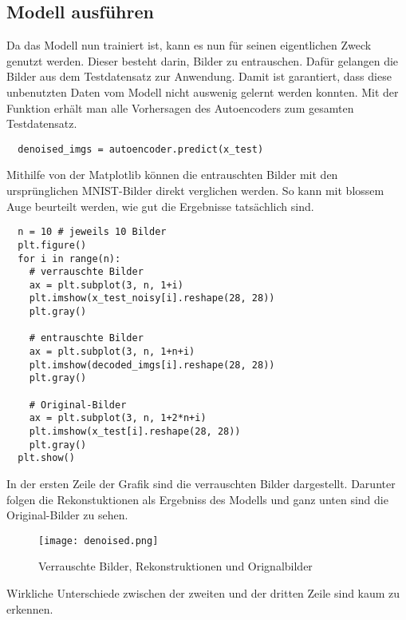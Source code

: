 \subsection{Modell ausführen}
Da das Modell nun trainiert ist, kann es nun für seinen eigentlichen Zweck
genutzt werden.
Dieser besteht darin, Bilder zu entrauschen. Dafür gelangen die
Bilder aus dem Testdatensatz zur Anwendung. Damit ist garantiert, dass diese
unbenutzten Daten vom Modell nicht auswenig gelernt werden konnten.
Mit der Funktion 
erhält man alle Vorhersagen des Autoencoders zum gesamten Testdatensatz.
\begin{verbatim}
  denoised_imgs = autoencoder.predict(x_test)
\end{verbatim}
Mithilfe von der Matplotlib können die entrauschten Bilder mit den
ursprünglichen MNIST-Bilder direkt verglichen werden.
So kann mit blossem Auge beurteilt werden, wie gut die Ergebnisse tatsächlich sind.
\begin{verbatim}
  n = 10 # jeweils 10 Bilder
  plt.figure()
  for i in range(n):
    # verrauschte Bilder
    ax = plt.subplot(3, n, 1+i)
    plt.imshow(x_test_noisy[i].reshape(28, 28))
    plt.gray()

    # entrauschte Bilder
    ax = plt.subplot(3, n, 1+n+i)
    plt.imshow(decoded_imgs[i].reshape(28, 28))
    plt.gray()

    # Original-Bilder
    ax = plt.subplot(3, n, 1+2*n+i)
    plt.imshow(x_test[i].reshape(28, 28))
    plt.gray()
  plt.show()
\end{verbatim}
In der ersten Zeile der Grafik sind die verrauschten Bilder dargestellt.
Darunter folgen die Rekonstuktionen als Ergebniss des Modells und ganz unten
sind die Original-Bilder zu sehen.
\begin{figure}[h!]
  \centering
  \texttt{[image: denoised.png]}
  \caption{Verrauschte Bilder, Rekonstruktionen und Orignalbilder}
\end{figure}
Wirkliche Unterschiede zwischen der zweiten und der dritten Zeile sind kaum zu erkennen.

